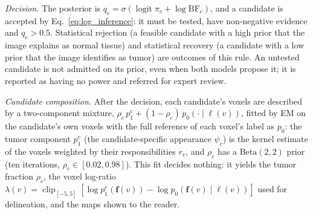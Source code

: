 \documentclass[fleqn,10pt]{olplainarticle}
\begin{document}
\textit{Decision.} The posterior is $q_c=\sigma(\operatorname{logit}\pi_c+\log\mathrm{BF}_c)$, and a candidate is
accepted by Eq.~\eqref{eq:log_inference}: it must be tested, have non-negative evidence and $q_c>0.5$. Statistical rejection
(a feasible candidate with a high prior that the image explains as normal tissue) and statistical recovery (a candidate
with a low prior that the image identifies as tumor) are outcomes of this rule. An untested candidate is not admitted on its
prior, even when both models propose it; it is reported as having no power and referred for expert review.

\textit{Candidate composition.} After the decision, each candidate's voxels are described by a two-component mixture,
$\rho_c\,p_1^{c}+(1-\rho_c)\,p_0(\cdot\mid\ell(v))$, fitted by EM on the candidate's own voxels with the full reference of
each voxel's label as $p_0$: the tumor component $p_1^{c}$ (the candidate-specific appearance $\psi_c$) is the kernel
estimate of the voxels weighted by their responsibilities $r_v$, and $\rho_c$ has a $\mathrm{Beta}(2,2)$ prior (ten
iterations, $\rho_c\in[0.02,0.98]$). This fit decides nothing: it yields the tumor fraction $\rho_c$, the voxel log-ratio
$\lambda(v)=\operatorname{clip}_{[-5,5]}[\log p_1^{c}(\mathbf{f}(v))-\log p_0(\mathbf{f}(v)\mid\ell(v))]$ used for
delineation, and the maps shown to the reader.
\end{document}
